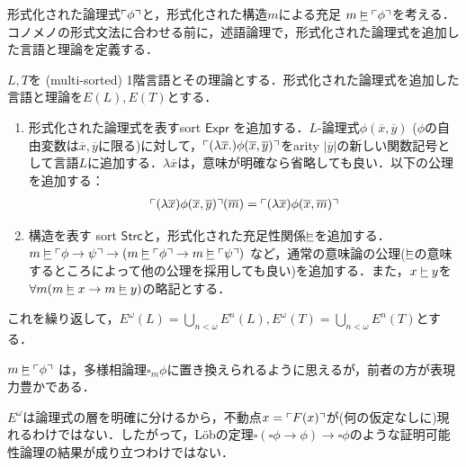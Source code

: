 \documentclass[../../main-detail.tex]{subfiles}
\begin{document}
形式化された論理式$\ulcorner \phi \urcorner$と，形式化された構造$m$による充足 $m \mathrel{\underline{\vDash}} \ulcorner \phi \urcorner$を考える．
コノメノの形式文法に合わせる前に，述語論理で，形式化された論理式を追加した言語と理論を定義する．
\begin{definition}
    $L, T$を (multi-sorted) 1階言語とその理論とする．形式化された論理式を追加した言語と理論を$E(L), E(T)$とする．
    \begin{enumerate}
        \item 形式化された論理式を表すsort $\mathsf{Expr}$ を追加する．$L$-論理式$\phi(\overline{x},\overline{y})$ ($\phi$の自由変数は$\overline{x},\overline{y}$に限る)に対して，$\ulcorner (\lambda \overline{x}.)\phi(\overline{x},\overline{y}) \urcorner$をarity $|\overline{y}|$の新しい関数記号として言語$L$に追加する．$\lambda \overline{x}$は，意味が明確なら省略しても良い．以下の公理を追加する：
        \begin{align*}
            \ulcorner (\lambda \overline{x})\phi(\overline{x},\overline{y}) \urcorner(\overline{m}) = \ulcorner (\lambda \overline{x})\phi(\overline{x},\overline{m}) \urcorner
        \end{align*}
        \item 構造を表す sort $\mathsf{Strc}$と，形式化された充足性関係$\mathrel{\underline{\vDash}}$を追加する．$m \mathrel{\underline{\vDash}} \ulcorner \phi \to \psi \urcorner \to (m \mathrel{\underline{\vDash}} \ulcorner \phi \urcorner \to m \mathrel{\underline{\vDash}}\ulcorner \psi \urcorner)$ など，通常の意味論の公理($\mathrel{\underline{\vDash}}$の意味するところによって他の公理を採用しても良い)を追加する．また，$x \mathrel{\underline{\vdash}} y$を$\forall m (m \mathrel{\underline{\vDash}} x \to m \mathrel{\underline{\vDash}} y)$の略記とする．
    \end{enumerate}
    これを繰り返して，$E^\omega(L) = \bigcup_{n<\omega} E^n(L), E^\omega(T) = \bigcup_{n<\omega} E^n(T)$とする．
\end{definition}
\begin{whynot}
    $m \mathrel{\underline{\vDash}} \ulcorner \phi \urcorner$ は，多様相論理$\square_m \phi$に置き換えられるように思えるが，前者の方が表現力豊かである．
\end{whynot}
\begin{remark}
    $E^\omega$は論理式の層を明確に分けるから，不動点$x = \ulcorner F(x) \urcorner$が(何の仮定なしに)現れるわけではない．したがって，Löbの定理$\square(\square \phi \to \phi) \to \square \phi$のような証明可能性論理の結果が成り立つわけではない．
\end{remark}
\end{document}
